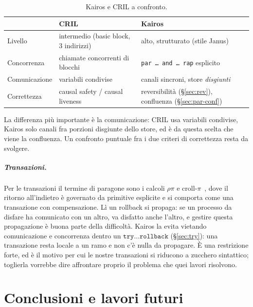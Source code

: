 \begin{table}[H]
\centering
\renewcommand{\arraystretch}{1.25}
\small
\begin{tabular}{l l l}
\hline
 & \textbf{CRIL}~\cite{OguchiYuen2024} & \textbf{Kairos}\\
\hline
Livello & intermedio (basic block, 3 indirizzi) & alto, strutturato (stile Janus)\\
Concorrenza & chiamate concorrenti di blocchi & \texttt{par\,\dots\,and\,\dots\,rap} esplicito\\
Comunicazione & variabili condivise & canali sincroni, store \emph{disgiunti}\\
Correttezza & causal safety / causal liveness & reversibilità (\S\ref{sec:rev}), confluenza (\S\ref{sec:par-conf})\\
\hline
\end{tabular}
\caption{Kairos e CRIL a confronto.}
\label{tab:cril}
\end{table}

\noindent
La differenza più importante è la comunicazione: CRIL usa variabili condivise,
Kairos solo canali fra porzioni disgiunte dello store, ed è da questa scelta che
viene la confluenza. Un confronto puntuale fra i due criteri di correttezza
resta da svolgere.

\paragraph{Transazioni.} Per le transazioni il termine di paragone sono i calcoli
$\rho\pi$ e croll-$\pi$~\cite{LaneseMezzinaSchmittStefani2011,%
LaneseLienhardtMezzinaSchmittStefani2013}, dove il ritorno all'indietro è
governato da primitive esplicite e si comporta come una transazione con
compensazione. Lì un rollback si propaga: se un processo da disfare ha
comunicato con un altro, va disfatto anche l'altro, e gestire questa
propagazione è buona parte della difficoltà. Kairos la evita vietando
comunicazione e concorrenza dentro un $\mathtt{try}\ldots\mathtt{rollback}$
(\S\ref{sec:try}): una transazione resta locale a un ramo e non c'è nulla da
propagare. È una restrizione forte, ed è il motivo per cui le nostre transazioni
si riducono a zucchero sintattico; toglierla vorrebbe dire affrontare proprio il
problema che quei lavori risolvono.

\chapter{Conclusioni e lavori futuri}
\label{chap:conclusioni}
\label{sec:concl}

